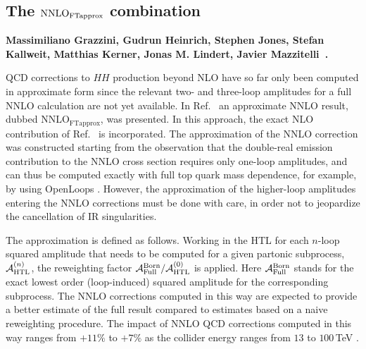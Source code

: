 \subsection[The \boldmath NNLO FTapprox combination]{The \boldmath $\textup{NNLO}_{\textup{FTapprox}}$ combination}
\label{sec:NNLO_FTapprox}


\textbf{Massimiliano Grazzini, Gudrun Heinrich, Stephen Jones, Stefan Kallweit, Mat\-thias Kerner, Jonas M. Lindert, Javier Mazzitelli~\cite{Grazzini:2018bsd}.}





\newcommand{\nnloBP}{NNLO$_{\mathrm{B-proj}}$}
\newcommand{\nnloNI}{NNLO$_{\mathrm{NLO-i}}$}
\newcommand{\nnloFT}{NNLO$_{\mathrm{FTapprox}}$}
\newcommand{\nloFT}{$\mathrm{NLO}_{\mathrm{FTapprox}}$}

\noindent QCD corrections to $HH$ production beyond NLO have so far only been computed in approximate form since the relevant two- and three-loop amplitudes for a full NNLO calculation are not yet available. In Ref.~\cite{Grazzini:2018bsd} an approximate NNLO result, dubbed \nnloFT, was presented. In this approach, the exact NLO contribution of Ref.~\cite{Borowka:2016ehy} is incorporated. The approximation of the NNLO correction was constructed starting from the observation that the double-real emission contribution to the NNLO cross section requires only one-loop amplitudes, and can thus be computed exactly with full top quark mass dependence, for example, by using OpenLoops \cite{Cascioli:2011va,Buccioni:2019sur}. However, the approximation of the higher-loop amplitudes entering the NNLO corrections must be done with care, in order not to jeopardize the cancellation of IR singularities.

The approximation is defined as follows. Working in the HTL for each $n$-loop squared amplitude that needs to be computed for a given partonic subprocess, ${\cal A}^{(n)}_{\rm HTL}$, the reweighting factor ${\cal A}_{\rm Full}^{\rm Born}/{\cal A}_{\rm HTL}^{\rm (0)}$ is applied. Here ${\cal A}_{\rm Full}^{\rm Born}$ stands for the exact lowest order (loop-induced) squared amplitude for the corresponding subprocess. The NNLO corrections computed in this way are expected to provide a better estimate of the full result compared to estimates based on a naive reweighting procedure. The impact of NNLO QCD corrections computed in this way ranges from $+11\%$ to $+7\%$ as the collider energy ranges from $13$ to $100$\,TeV \cite{Grazzini:2018bsd}.

